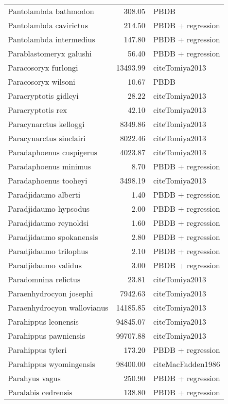 \begin{table}[ht]
\begin{tabular}{lrl}
  Pantolambda bathmodon & 308.05 & PBDB \\ 
  Pantolambda cavirictus & 214.50 & PBDB + regression \\ 
  Pantolambda intermedius & 147.80 & PBDB + regression \\ 
  Parablastomeryx galushi & 56.40 & PBDB + regression \\ 
  Paracosoryx furlongi & 13493.99 & cite{Tomiya2013} \\ 
  Paracosoryx wilsoni & 10.67 & PBDB \\ 
  Paracryptotis gidleyi & 28.22 & cite{Tomiya2013} \\ 
  Paracryptotis rex & 42.10 & cite{Tomiya2013} \\ 
  Paracynarctus kelloggi & 8349.86 & cite{Tomiya2013} \\ 
  Paracynarctus sinclairi & 8022.46 & cite{Tomiya2013} \\ 
  Paradaphoenus cuspigerus & 4023.87 & cite{Tomiya2013} \\ 
  Paradaphoenus minimus & 8.70 & PBDB + regression \\ 
  Paradaphoenus tooheyi & 3498.19 & cite{Tomiya2013} \\ 
  Paradjidaumo alberti & 1.40 & PBDB + regression \\ 
  Paradjidaumo hypsodus & 2.00 & PBDB + regression \\ 
  Paradjidaumo reynoldsi & 1.60 & PBDB + regression \\ 
  Paradjidaumo spokanensis & 2.80 & PBDB + regression \\ 
  Paradjidaumo trilophus & 2.10 & PBDB + regression \\ 
  Paradjidaumo validus & 3.00 & PBDB + regression \\ 
  Paradomnina relictus & 23.81 & cite{Tomiya2013} \\ 
  Paraenhydrocyon josephi & 7942.63 & cite{Tomiya2013} \\ 
  Paraenhydrocyon wallovianus & 14185.85 & cite{Tomiya2013} \\ 
  Parahippus leonensis & 94845.07 & cite{Tomiya2013} \\ 
  Parahippus pawniensis & 99707.88 & cite{Tomiya2013} \\ 
  Parahippus tyleri & 173.20 & PBDB + regression \\ 
  Parahippus wyomingensis & 98400.00 & cite{MacFadden1986} \\ 
  Parahyus vagus & 250.90 & PBDB + regression \\ 
  Paralabis cedrensis & 138.80 & PBDB + regression \\ 

\end{tabular}
\end{table}
